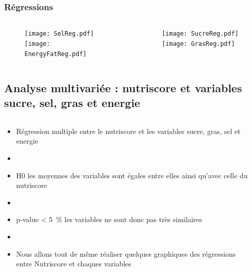 \subsubsection{Régressions}
\begin{frame}{\insertsubsubsection}
  \begin{columns}
    \begin{column}{.5\textwidth}
      \begin{figure}
        \texttt{[image: SelReg.pdf]}
        \texttt{[image: EnergyFatReg.pdf]}
      \end{figure}
    \end{column}
    \begin{column}{.5\textwidth}
      \begin{figure}
        \texttt{[image: SucreReg.pdf]}
        \texttt{[image: GrasReg.pdf]}
      \end{figure}
    \end{column}
  \end{columns}
\end{frame}

\subsection{Analyse multivariée : nutriscore et variables sucre, sel, gras et energie}
\begin{frame}{\insertsubsection}
  \begin{columns}
    \begin{column}{.5\textwidth}
      \begin{itemize}
        \item Régression multiple entre le nutriscore et les variables
              sucre, gras, sel et energie
        \item[]
        \item H0 les moyennes des variables sont égales entre elles
              ainsi qu'avec celle du nutriscore
        \item[]
        \item p-value \qty{< 5}{\percent} les variables ne sont donc pas très similaires
        \item[]
        \item Nous allons tout de même réaliser quelques graphiques des régressions
              entre Nutriscore et chaques variables
      \end{itemize}
    \end{column}
    \begin{column}{.5\textwidth}
      \begin{table}
        \tiny
        
      \end{table}
    \end{column}
  \end{columns}
\end{frame}

